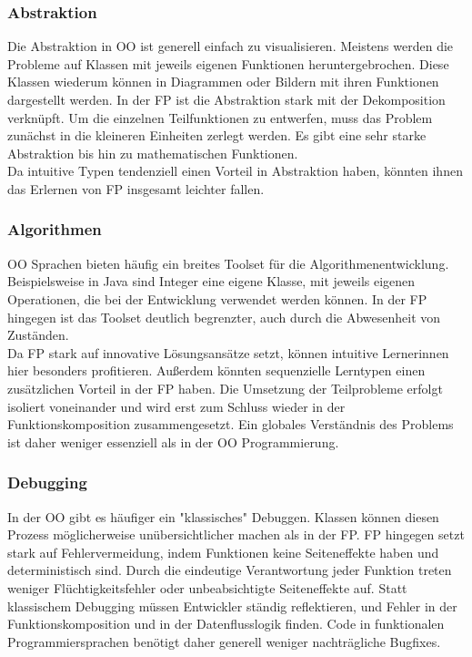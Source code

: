 \subsubsection{Abstraktion}
Die Abstraktion in OO ist generell einfach zu visualisieren. Meistens werden die Probleme auf Klassen mit jeweils eigenen Funktionen heruntergebrochen. Diese Klassen wiederum können in Diagrammen oder Bildern mit ihren Funktionen dargestellt werden.
In der FP ist die Abstraktion stark mit der Dekomposition verknüpft. Um die einzelnen Teilfunktionen zu entwerfen, muss das Problem zunächst in die kleineren Einheiten zerlegt werden.
Es gibt eine sehr starke Abstraktion bis hin zu mathematischen Funktionen.
\\
Da intuitive Typen tendenziell einen Vorteil in Abstraktion haben, könnten ihnen das Erlernen von FP insgesamt leichter fallen.

\subsubsection{Algorithmen}
OO Sprachen bieten häufig ein breites Toolset für die Algorithmenentwicklung. Beispielsweise in Java sind Integer eine eigene Klasse, mit jeweils eigenen Operationen, die bei der Entwicklung verwendet werden können. In der FP hingegen ist das Toolset deutlich begrenzter, auch durch die Abwesenheit von Zuständen.
\\
Da FP stark auf innovative Lösungsansätze setzt, können intuitive Lernerinnen hier besonders profitieren.
Außerdem könnten sequenzielle Lerntypen einen zusätzlichen Vorteil in der FP haben. Die Umsetzung der Teilprobleme erfolgt isoliert voneinander und wird erst zum Schluss wieder in der Funktionskomposition zusammengesetzt. Ein globales Verständnis des Problems ist daher weniger essenziell als in der OO Programmierung.

\subsubsection{Debugging}
In der OO gibt es häufiger ein "klassisches" Debuggen. Klassen können diesen Prozess möglicherweise unübersichtlicher machen als in der FP. FP hingegen setzt stark auf Fehlervermeidung, indem Funktionen keine Seiteneffekte haben und deterministisch sind. Durch die eindeutige Verantwortung jeder Funktion treten weniger Flüchtigkeitsfehler oder unbeabsichtigte Seiteneffekte auf. Statt klassischem Debugging müssen Entwickler ständig reflektieren, und Fehler in der Funktionskomposition und in der Datenflusslogik finden.
Code in funktionalen Programmiersprachen benötigt daher generell weniger nachträgliche Bugfixes.

